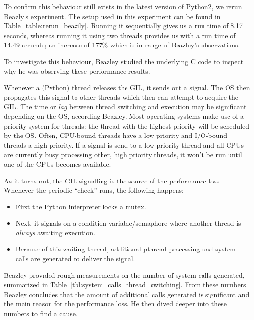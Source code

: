 To confirm this behaviour still exists in the latest version of Python2, we rerun Beazly's experiment.
The setup used in this experiment can be found in Table~\ref{table:rerun_beazily}.
Running it sequentially gives us a run time of 8.17 seconds, whereas running it using two threads provides us with a run time of 14.49 seconds; an increase of 177\% which is in range of Beazley's observations.

To investigate this behaviour, Beazley studied the underlying C code to inspect why he was observing these performance results.

Whenever a (Python) thread releases the GIL, it sends out a signal.
The OS then propagates this signal to other threads which then can attempt to acquire the GIL.
The time or \emph{lag} between thread switching and execution may be significant depending on the OS, according Beazley.
Most operating systems make use of a priority system for threads: the thread with the highest priority will be scheduled by the OS.
Often, CPU-bound threads have a low priority and I/O-bound threads a high priority.
If a signal is send to a low priority thread and all CPUs are currently busy processing other, high priority threads, it won't be run until one of the CPUs becomes available.

As it turns out, the GIL signalling is the source of the performance loss.
Whenever the periodic \enquote{check} runs, the following happens:

\begin{itemize}
	\item First the Python interpreter locks a mutex.
	\item Next, it signals on a condition variable/semaphore where another thread is \emph{always} awaiting execution.
	\item Because of this waiting thread, additional pthread processing and system calls are generated to deliver the signal.
\end{itemize}

Beazley provided rough measurements on the number of system calls generated, summarized in Table~\ref{tbl:system_calls_thread_switching}.
From these numbers Beazley concludes that the amount of additional calls generated is significant and the main reason for the performance loss.
He then dived deeper into these numbers to find a cause.

